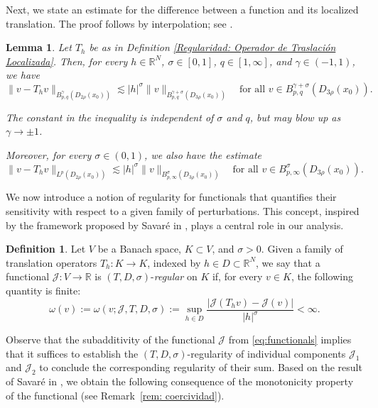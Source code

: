\documentclass[]{amsart}
\newtheorem{Lemma}[theorem]{Lemma}
\theoremstyle{definition}
\theoremstyle{definition}
\newtheorem{definition}[theorem]{Definition}
\theoremstyle{remark}
\numberwithin{equation}{section}
\begin{document}
	Next, we state an estimate for the difference between a function and its localized translation. The proof follows by interpolation; see \cite[Lemma 2.9]{borthagaray2023besov}. 
	\begin{Lemma} 
    \label{lemm: diferencia-traslacion-v}
    Let \( T_h \) be as in Definition \ref{Regularidad: Operador de Traslación Localizada}. Then, for every \( h \in \mathbb{R}^N \), \( \sigma \in [0,1] \), \( q \in [1, \infty] \), and \( \gamma \in (-1,1) \), we have
		\[
		\|v - T_h v\|_{B^{\gamma}_{p,q}(D_{2\rho}(x_0))} \lesssim |h|^\sigma \|v\|_{B^{\gamma + \sigma}_{p,q}(D_{3\rho}(x_0))} \quad \text{for all } v \in B^{\gamma + \sigma}_{p,q}(D_{3\rho}(x_0)).
		\]
		
		The constant in the inequality is independent of \( \sigma \) and \( q \), but may blow up as \( \gamma \to \pm 1 \).
		
		Moreover, for every \( \sigma \in (0,1) \), we also have the estimate
		\[
		\|v - T_h v\|_{L^p(D_{2\rho}(x_0))} \lesssim |h|^\sigma \|v\|_{B^{\sigma}_{p,\infty}(D_{3\rho}(x_0))} \quad \text{for all } v \in B^{\sigma}_{p,\infty}(D_{3\rho}(x_0)).
		\]
	\end{Lemma}
	We now introduce a notion of regularity for functionals that quantifies their sensitivity with respect to a given family of perturbations. This concept, inspired by the framework proposed by Savaré in \cite{savare1998regularity}, plays a central role in our analysis.
	
	\begin{definition}
		\label{Regularidad: Definición Regularidad Local}
		Let \( V \) be a Banach space,  \( K \subset V \), and  \( \sigma > 0 \). Given a family of translation operators \( T_h: K \to K \), indexed by \( h \in D \subset \mathbb{R}^N \), we say that a functional \(  \mathcal{J}: V \to \mathbb{R} \) is \((T, D, \sigma)\)-\emph{regular} on \( K \) if, for every \( v \in K \), the following quantity is finite:
		\[
		\omega(v) := \omega(v; \mathcal{J}, T, D, \sigma) := \sup_{h \in D} \frac{\left| \mathcal{J}(T_h v) - \mathcal{J}(v) \right|}{|h|^{\sigma}} < \infty.
		\]
	\end{definition}
	
	Observe that the subadditivity of the functional 
    $\mathcal J$ from \eqref{eq:functionals} implies that it suffices to establish the \((T, D, \sigma)\)-regularity of individual components \( \mathcal{J}_1 \) and \( \mathcal{J}_2 \) to conclude the corresponding regularity of their sum. Based on the result of Savaré in \cite[Theorem 1 and Corollary 1]{savare1998regularity}, we obtain the following consequence of the monotonicity property of the functional (see Remark~\ref{rem: coercividad}).
	
\end{document}

